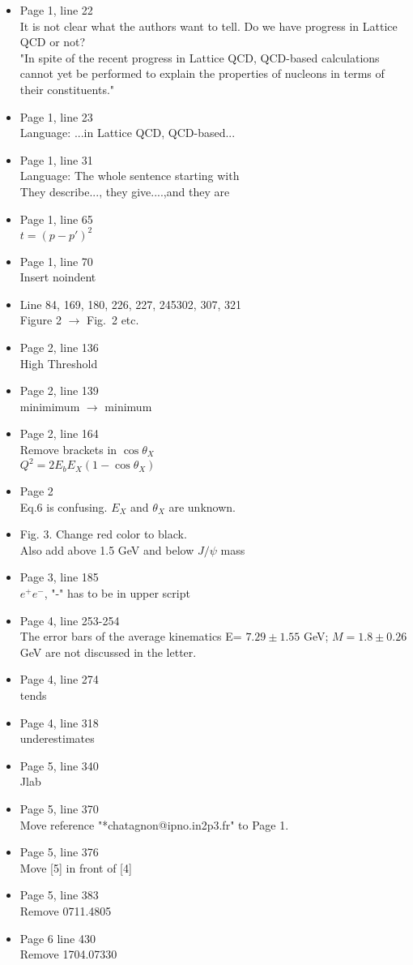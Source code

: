\documentclass[11pt]{article}
\begin{document}
\begin{itemize}
\item Page 1, line 22\\
It is not clear what the authors want to tell. Do we have progress in Lattice QCD or not?\\
"In spite of the recent progress in Lattice QCD, QCD-based calculations cannot yet be performed to explain the properties of nucleons in terms of their constituents."
\item Page 1, line 23\\
Language: ...in Lattice QCD, QCD-based...
\item Page 1, line 31\\
Language: The whole sentence starting with\\
 They describe..., they give....,and they are
\item Page 1, line 65\\
   $t = (p-p')^2$
\item Page 1, line 70\\
Insert  noindent 
\item Line 84, 169, 180, 226, 227, 245302, 307, 321\\
Figure 2 $\to$ Fig.~2 etc.
\item Page 2, line 136\\
High Threshold
\item Page 2, line 139\\
minimimum $\to$ minimum
\item Page 2, line 164\\
Remove brackets in $\cos\theta_X$\\
$Q^2=2E_bE_X(1-\cos\theta_X)$
\item Page 2\\
Eq.6 is confusing. $E_X$ and $\theta_X$ are unknown.
\item Fig. 3. Change red color to black. \\
Also add above 1.5 GeV and below $J/\psi$ mass
\item Page 3, line 185\\
$e^+e^-$, "-" has to be in upper script
\item Page 4, line 253-254\\
The error bars of the average kinematics 
E= $7.29\pm1.55$ GeV; $M = 1.8\pm0.26$ GeV are not discussed in the letter.
\item Page 4, line 274\\
tends
\item Page 4, line 318\\
underestimates
\item Page 5, line 340\\
Jlab
\item Page 5, line 370\\
Move reference "*chatagnon@ipno.in2p3.fr"  to Page 1.
\item Page 5, line 376\\
Move [5] in front of [4]
\item Page 5, line 383\\
Remove 0711.4805
\item Page 6 line 430\\
Remove 1704.07330
\end{itemize}
\end{document}
